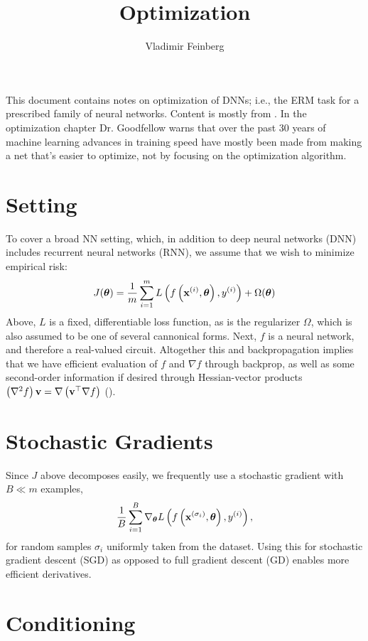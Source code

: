 \documentclass{article}
\title{Optimization}
\author{Vladimir Feinberg}
\begin{document}
\maketitle

This document contains notes on optimization of DNNs; i.e., the ERM task for a prescribed family of neural networks. Content is mostly from . In the optimization chapter Dr. Goodfellow warns that over the past 30 years of machine learning advances in training speed have mostly been made from making a net that's easier to optimize, not by focusing on the optimization algorithm.

\section{Setting}

To cover a broad NN setting, which, in addition to deep neural networks (DNN) includes recurrent neural networks (RNN), we assume that we wish to minimize empirical risk:
$$
J({\boldsymbol\theta})=\frac{1}{m}\sum_{i=1}^mL\left({f\left({\textbf{x}^{(i)}, {\boldsymbol\theta}}\right), y^{(i)}}\right) + \Omega({\boldsymbol\theta})
$$
Above, $L$ is a fixed, differentiable loss function, as is the regularizer $\Omega$, which is also assumed to be one of several cannonical forms. Next, $f$ is a neural network, and therefore a real-valued circuit. Altogether this and backpropagation implies that we have efficient evaluation of $f$ and $\nabla f$ through backprop, as well as some second-order information if desired through Hessian-vector products $\left({\nabla^2 f}\right)\textbf{v}=\nabla\left({\textbf{v}^\top\nabla f}\right)$ ().

\section{Stochastic Gradients}

Since $J$ above decomposes easily, we frequently use a stochastic gradient with $B\ll m$ examples,
$$\frac{1}{B}\sum_{i=1}^B\nabla_{\boldsymbol\theta} L\left({f\left({\textbf{x}^{(\sigma_i)}, {\boldsymbol\theta}}\right), y^{(i)}}\right),$$ for random samples $\sigma_i$ uniformly taken from the dataset. Using this for stochastic gradient descent (SGD) as opposed to full gradient descent (GD) enables more efficient derivatives.

\section{Conditioning}
\end{document}
